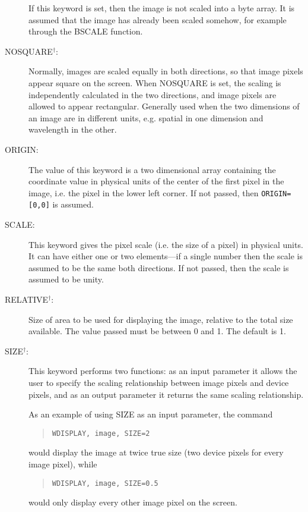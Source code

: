 \begin{description}
If this keyword is set, then the image is not scaled into a byte array.  It is
assumed that the image has already been scaled somehow, for example through the
BSCALE function.
\item[NOSQUARE$^\dagger$:]
Normally, images are scaled equally in both directions, so that image pixels
appear square on the screen.  When NOSQUARE is set, the scaling is
independently calculated in the two directions, and image pixels are allowed to
appear rectangular.  Generally used when the two dimensions of an image are in
different units, e.g. spatial in one dimension and wavelength in the other.
\item[ORIGIN:]
The value of this keyword is a two dimensional array containing the coordinate
value in physical units of the center of the first pixel in the image, i.e. the
pixel in the lower left corner.  If not
passed, then \verb+ORIGIN=[0,0]+ is assumed.
\item[SCALE:]
This keyword gives the pixel scale (i.e. the size of a pixel) in physical
units.  It can have either one or two elements---if a single number then the
scale is assumed to be the same both directions.  If not passed, then the scale
is assumed to be unity.
\item[RELATIVE$^\dagger$:]
Size of area to be used for displaying the image, relative to the total size
available.  The value passed must be between 0 and 1.  The default is 1.
\item[SIZE$^\dagger$:]
This keyword performs two functions: as an input parameter it allows the user
to specify the scaling relationship between image pixels and device pixels, and
as an output parameter it returns the same scaling relationship.

As an example of using SIZE as an input parameter, the command
\begin{quote}
\begin{verbatim}
WDISPLAY, image, SIZE=2
\end{verbatim}
\end{quote}
would display the image at twice true size (two device pixels for every image
pixel), while
\begin{quote}
\begin{verbatim}
WDISPLAY, image, SIZE=0.5
\end{verbatim}
\end{quote}
would only display every other image pixel on the screen.


\end{description}
